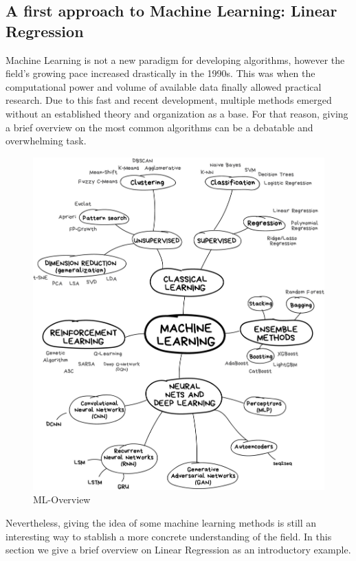 
\subsection{A first approach to Machine Learning: Linear Regression}

Machine Learning is not a new paradigm for developing algorithms, however the field's growing pace increased drastically in the 1990s. This was when the computational power and volume of available data finally allowed practical research. Due to this fast and recent development, multiple methods emerged without an established theory and organization as a base. For that reason, giving a brief overview on the most common algorithms can be a debatable and overwhelming task. 

\begin{figure}[hbtp]
	\centering
	\includegraphics[width=1\textwidth]{ML}
	\caption{ML-Overview}
	\label{fig:Datensatz - unbearbeitet}
\end{figure}

Nevertheless, giving the idea of some machine learning methods is still an interesting way to stablish a more concrete understanding of the field. In this section we give a brief overview on Linear Regression as an introductory example. 

